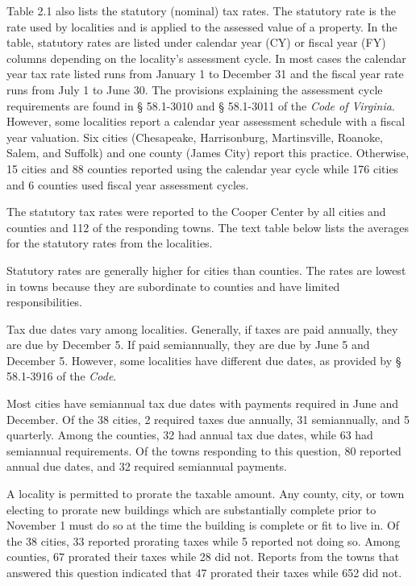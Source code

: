 \documentclass[
]{book}
\newenvironment{Shaded}{\begin{snugshade}}{\end{snugshade}}
\newcommand{\CommentTok}[1]{\textcolor[rgb]{0.56,0.35,0.01}{\textit{#1}}}
\begin{document}
Table 2.1 also lists the statutory (nominal) tax rates. The statutory rate is the rate used by localities and is applied to the assessed value of a property. In the table, statutory rates are listed under calendar year (CY) or fiscal year (FY) columns depending on the locality's assessment cycle. In most cases the calendar year tax rate listed runs from January 1 to December 31 and the fiscal year rate runs from July 1 to June 30. The provisions explaining the assessment cycle requirements are found in § 58.1-3010 and § 58.1-3011 of the \emph{Code of Virginia}. However, some localities report a calendar year assessment schedule with a fiscal year valuation. Six cities (Chesapeake, Harrisonburg, Martinsville, Roanoke, Salem, and Suffolk) and one county (James City) report this practice. Otherwise, 15 cities and 88 counties reported using the calendar year cycle while 176 cities and 6 counties used fiscal year assessment cycles.

The statutory tax rates were reported to the Cooper Center by all cities and counties and 112 of the responding towns. The text table below lists the averages for the statutory rates from the localities.

\begin{Shaded}
\end{Shaded}

Statutory rates are generally higher for cities than counties. The rates are lowest in towns because they are subordinate to counties and have limited responsibilities.

Tax due dates vary among localities. Generally, if taxes are paid annually, they are due by December 5. If paid semiannually, they are due by June 5 and December 5. However, some localities have different due dates, as provided by § 58.1-3916 of the \emph{Code}.

Most cities have semiannual tax due dates with payments required in June and December. Of the 38 cities, 2 required taxes due annually, 31 semiannually, and 5 quarterly. Among the counties, 32 had annual tax due dates, while 63 had semiannual requirements. Of the towns responding to this question, 80 reported annual due dates, and 32 required semiannual payments.

A locality is permitted to prorate the taxable amount. Any county, city, or town electing to prorate new buildings which are substantially complete prior to November 1 must do so at the time the building is complete or fit to live in. Of the 38 cities, 33 reported prorating taxes while 5 reported not doing so. Among counties, 67 prorated their taxes while 28 did not. Reports from the towns that answered this question indicated that 47 prorated their taxes while 652 did not.
\end{document}
